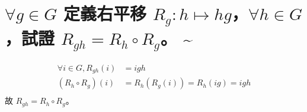 \documentclass{article}
\begin{document}
\section{$\forall g\in G$ 定義右平移 $R_g:h\mapsto hg$，$\forall h\in G$，試證 $R_{gh}=R_{h}\circ R_{g}$。 \~}
\begin{framed}
  $$\begin{aligned}
      \forall i \in G,{R_{gh}}\left( i \right)           & = igh                                                                          \\
      \left( {{R_h} \circ {R_g}} \right)\left( i \right) & = {R_h}\left( {{R_g}\left( i \right)} \right) = {R_h}\left( {ig} \right) = igh \\
    \end{aligned} $$
  故 ${R_{gh}} = {R_h} \circ {R_g}$。
\end{framed}
\end{document}
